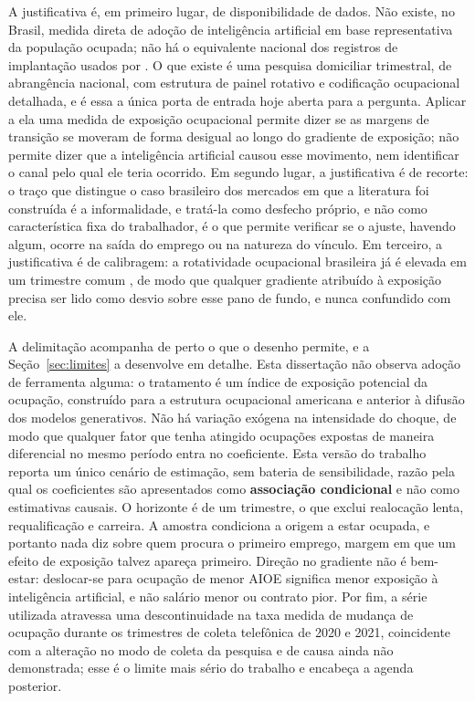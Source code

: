 A justificativa é, em primeiro lugar, de disponibilidade de dados. Não existe,
no Brasil, medida direta de adoção de inteligência artificial em base
representativa da população ocupada; não há o equivalente nacional dos registros
de implantação usados por . O que existe é uma
pesquisa domiciliar trimestral, de abrangência nacional, com estrutura de painel
rotativo e codificação ocupacional detalhada, e é essa a única porta de entrada
hoje aberta para a pergunta. Aplicar a ela uma medida de exposição ocupacional
permite dizer se as margens de transição se moveram de forma desigual ao longo
do gradiente de exposição; não permite dizer que a inteligência artificial
causou esse movimento, nem identificar o canal pelo qual ele teria ocorrido. Em
segundo lugar, a justificativa é de recorte: o traço que distingue o caso
brasileiro dos mercados em que a literatura foi construída é a informalidade, e
tratá-la como desfecho próprio, e não como característica fixa do trabalhador,
é o que permite verificar se o ajuste, havendo algum, ocorre na saída do emprego
ou na natureza do vínculo. Em terceiro, a justificativa é de calibragem: a
rotatividade ocupacional brasileira já é elevada em um trimestre comum
\parencite{higano2023,wroblevski2024}, de modo que qualquer gradiente atribuído
à exposição precisa ser lido como desvio sobre esse pano de fundo, e nunca
confundido com ele.

A delimitação acompanha de perto o que o desenho permite, e a
Seção~\ref{sec:limites} a desenvolve em detalhe. Esta dissertação não observa
adoção de ferramenta alguma: o tratamento é um índice de exposição potencial da
ocupação, construído para a estrutura ocupacional americana e anterior à difusão
dos modelos generativos. Não há variação exógena na intensidade do choque, de
modo que qualquer fator que tenha atingido ocupações expostas de maneira
diferencial no mesmo período entra no coeficiente. Esta versão do trabalho
reporta um único cenário de estimação, sem bateria de sensibilidade, razão pela
qual os coeficientes são apresentados como \textbf{associação condicional} e não
como estimativas causais. O horizonte é de um trimestre, o que exclui
realocação lenta, requalificação e carreira. A amostra condiciona a origem a
estar ocupada, e portanto nada diz sobre quem procura o primeiro emprego, margem
em que um efeito de exposição talvez apareça primeiro. Direção no
gradiente não é bem-estar: deslocar-se para ocupação de menor AIOE significa
menor exposição à inteligência artificial, e não salário menor ou contrato pior.
Por fim, a série utilizada atravessa uma descontinuidade na taxa medida de
mudança de ocupação durante os trimestres de coleta telefônica de 2020 e 2021,
coincidente com a alteração no modo de coleta da pesquisa
\parencite{ibge2022tratamento} e de causa ainda não demonstrada; esse é o limite
mais sério do trabalho e encabeça a agenda posterior.

